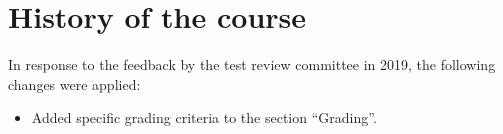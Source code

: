 \documentclass[a4paper,12pt]{report}
\begin{document}
\chapter{History of the course}
In response to the feedback by the test review committee in 2019, the following changes were applied:
\begin{itemize}
\item Added specific grading criteria to the section ``Grading''.
\end{itemize}



 



 
 
 
\end{document}
